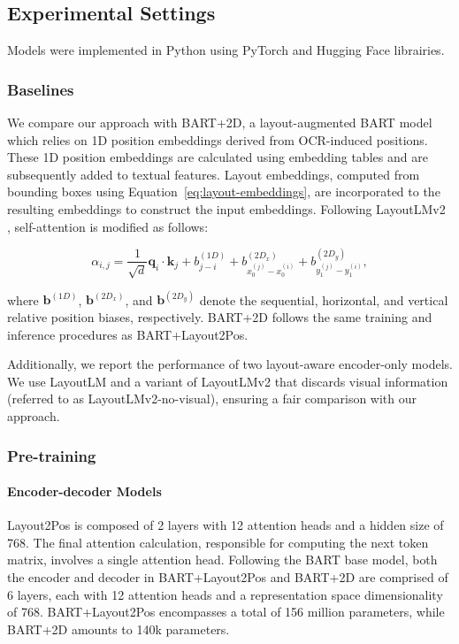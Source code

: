 \subsection{Experimental Settings}

Models were implemented in Python using PyTorch \citep{paszke2017automatic} and Hugging Face \citep{wolf2019huggingface} librairies. 

\subsubsection{Baselines}

We compare our approach with BART+2D, a layout-augmented \ac{BART} model which relies on 1D position embeddings derived from \ac{OCR}-induced positions. These 1D position embeddings are calculated using embedding tables and are subsequently added to textual features. Layout embeddings, computed from bounding boxes using Equation~\ref{eq:layout-embeddings}, are incorporated to the resulting embeddings to construct the input embeddings. Following LayoutLMv2 \citep{xu2020layoutlmv2}, self-attention is modified as follows: 

\begin{equation}
  \alpha_{i,j} = \dfrac{1}{\sqrt{d}} \bm{q}_i \cdot \bm{k}_j + b^{(1D)}_{j - i} + b^{(2D_x)}_{x^{(j)}_{0} - x^{(i)}_{0}} + b^{(2D_y)}_{y^{(j)}_{1} - y^{(i)}_{1}},
\end{equation}

\noindent where $\bm{b}^{(1D)}$, $\bm{b}^{(2D_x)}$, and $\bm{b}^{(2D_y)}$ denote the sequential, horizontal, and vertical relative position biases, respectively. BART+2D follows the same training and inference procedures as BART+Layout2Pos.

Additionally, we report the performance of two layout-aware encoder-only models. We use LayoutLM and a variant of LayoutLMv2 that discards visual information (referred to as LayoutLMv2-no-visual), ensuring a fair comparison with our approach. 

\subsubsection{Pre-training}

\paragraph{Encoder-decoder Models} Layout2Pos is composed of 2 layers with 12 attention heads and a hidden size of 768. The final attention calculation, responsible for computing the next token matrix, involves a single attention head. Following the \ac{BART} base model, both the encoder and decoder in BART+Layout2Pos and BART+2D are comprised of 6 layers, each with 12 attention heads and a representation space dimensionality of 768. BART+Layout2Pos encompasses a total of 156 million parameters, while BART+2D amounts to 140k parameters. 


